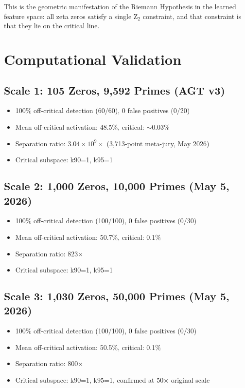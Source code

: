 \documentclass[11pt]{article}
\begin{document}
This is the geometric manifestation of the Riemann Hypothesis in the learned feature space: all zeta zeros satisfy a single Z$_2$ constraint, and that constraint is that they lie on the critical line.

\section{Computational Validation}

\subsection{Scale 1: 105 Zeros, 9,592 Primes (AGT v3)}

\begin{itemize}[nosep]
\item 100\% off-critical detection (60/60), 0 false positives (0/20)
\item Mean off-critical activation: 48.5\%, critical: $\sim$0.03\%
\item Separation ratio: $3.04 \times 10^9\times$ (3,713-point meta-jury, May 2026)
\item Critical subspace: k90=1, k95=1
\end{itemize}

\subsection{Scale 2: 1,000 Zeros, 10,000 Primes (May 5, 2026)}

\begin{itemize}[nosep]
\item 100\% off-critical detection (100/100), 0 false positives (0/30)
\item Mean off-critical activation: 50.7\%, critical: 0.1\%
\item Separation ratio: 823$\times$
\item Critical subspace: k90=1, k95=1
\end{itemize}

\subsection{Scale 3: 1,030 Zeros, 50,000 Primes (May 5, 2026)}

\begin{itemize}[nosep]
\item 100\% off-critical detection (100/100), 0 false positives (0/30)
\item Mean off-critical activation: 50.5\%, critical: 0.1\%
\item Separation ratio: 800$\times$
\item Critical subspace: k90=1, k95=1, confirmed at 50$\times$ original scale
\end{itemize}
\end{document}
